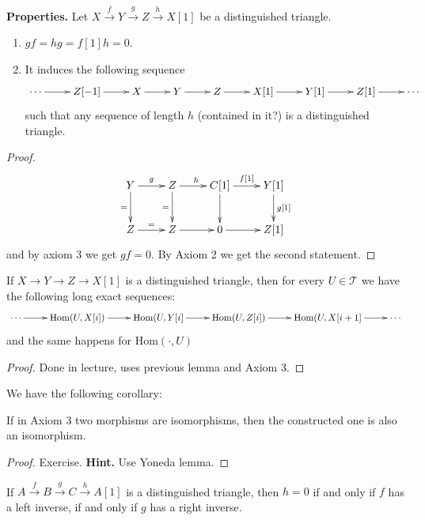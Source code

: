 {\bf Properties.} Let $X\xrightarrow{f}Y\xrightarrow{g}Z\xrightarrow{h}X[1]$ be
a distinguished triangle.

\begin{lemma}
\label{lemma-properties-of-distinguished-triangles}
\begin{enumerate}
\item $gf=hg=f[1]h=0$.
\item It induces the following sequence
$$
\xymatrix{ 
\cdots\ar[r]&Z[-1]\ar[r]& X\ar[r]& Y\ar[r]& Z\ar[r]&X[1]
\ar[r]&Y[1]\ar[r]& Z[1]\ar[r]&\cdots
}
$$
such that any sequence of length $h$ (contained in it?) is a distinguished
triangle.
\end{enumerate}
\end{lemma}

\begin{proof}
$$
\xymatrix{
Y\ar[r]^g\ar[d]_=& Z\ar[d]_=\ar[r]^h& C[1]\ar[r]^{f[1]}\ar[d]&
Y[1]\ar[d]^{g[1]}\\
Z\ar[r]^{=}&Z\ar[r]& 0\ar[r]&Z[1]
}
$$
and by axiom 3 we get $gf=0$. By Axiom 2 we get the second statement.
\end{proof}

\begin{lemma}
\label{lemma-long-exact-sequences-for-distinguished-triangles}
If $X \to Y \to Z \to X[1]$ is a distinguished triangle, then for every $U \in
\mathcal{T}$ we have the following long exact sequences:
$$
\xymatrix{
\cdots\ar[r]&\text{Hom}(U,X[i])\ar[r]&\text{Hom}(U,Y[i]\ar[r]&
\text{Hom}(U,Z[i])\ar[r]&\text{Hom}(U,X[i+1]\ar[r]&\cdots
}
$$
and the same happens for $\text{Hom}(\cdot,U)$
\end{lemma}

\begin{proof}
Done in lecture, uses previous lemma and Axiom 3.
\end{proof}

We have the following corollary:

\begin{lemma}
\label{lemma-two-isomorphisms-give-an-isomorphism}
If in Axiom 3 two morphisms are isomorphisms, then the constructed one is also
an isomorphism.
\end{lemma}

\begin{proof}
Exercise. {\bf Hint.} Use Yoneda lemma.
\end{proof}

\begin{exercise}
\label{exercise-inverses-in-distinguished-triangles}
If $A\xrightarrow{f}B\xrightarrow{g}C\xrightarrow{h}A[1]$ is a distinguished
triangle, then $h=0$ if and only if $f$ has a left inverse, if and only if $g$
has a right inverse. 
\end{exercise}


